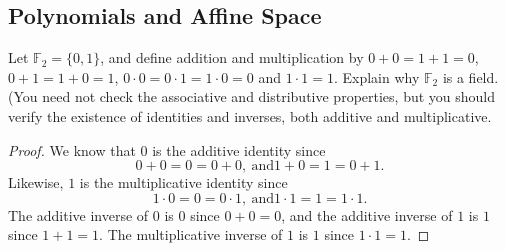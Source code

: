 \subsection{Polynomials and Affine Space}
\begin{exercise}{1}
Let $\mathbb{F}_2 = \{0,1\}$, and define addition and multiplication by $0+0 = 1+1 = 0$, $0+1 = 1+0 = 1$, $0\cdot 0 = 0\cdot 1 = 1\cdot 0 = 0$ and $1\cdot 1 = 1$. Explain why $\mathbb{F}_2$ is a field. (You need not check the associative and distributive properties, but you should verify the existence of identities and inverses, both additive and multiplicative.
\end{exercise}
\begin{proof}
    We know that $0$ is the additive identity since
    $$0 + 0 = 0 = 0+0,~\text{and} 1+0 = 1 = 0+1.$$
    Likewise, $1$ is the multiplicative identity since
     $$1\cdot 0 = 0 = 0\cdot 1,~\text{and} 1\cdot 1 = 1 = 1\cdot 1.$$
   The additive inverse of $0$ is $0$ since $0+0=0$, and the additive inverse of $1$ is $1$ since $1+1=1$. The multiplicative inverse of $1$ is $1$ since $1\cdot 1 = 1$.
\end{proof}

